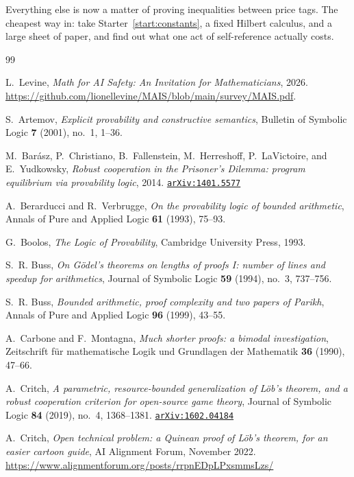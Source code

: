 \documentclass[11pt]{amsart}
\newcommand{\arxiv}[1]{\href{https://arxiv.org/abs/#1}{\texttt{arXiv:#1}}}
\theoremstyle{plain}
\theoremstyle{definition}
\begin{document}
Everything else is now a matter of proving inequalities between price tags. The cheapest way in: take Starter~\ref{start:constants}, a fixed Hilbert calculus, and a large sheet of paper, and find out what one act of self-reference actually costs.

\begin{thebibliography}{99}

L.~Levine,
\emph{Math for AI Safety: An Invitation for Mathematicians},
2026. \url{https://github.com/lionellevine/MAIS/blob/main/survey/MAIS.pdf}.


S.~Artemov,
\emph{Explicit provability and constructive semantics},
Bulletin of Symbolic Logic \textbf{7} (2001), no.~1, 1--36.

M.~Bar\'asz, P.~Christiano, B.~Fallenstein, M.~Herreshoff, P.~LaVictoire, and E.~Yudkowsky,
\emph{Robust cooperation in the Prisoner's Dilemma: program equilibrium via provability logic},
2014. \arxiv{1401.5577}

A.~Berarducci and R.~Verbrugge,
\emph{On the provability logic of bounded arithmetic},
Annals of Pure and Applied Logic \textbf{61} (1993), 75--93.

G.~Boolos,
\emph{The Logic of Provability},
Cambridge University Press, 1993.

S.~R. Buss,
\emph{On G\"odel's theorems on lengths of proofs I: number of lines and speedup for arithmetics},
Journal of Symbolic Logic \textbf{59} (1994), no.~3, 737--756.

S.~R. Buss,
\emph{Bounded arithmetic, proof complexity and two papers of Parikh},
Annals of Pure and Applied Logic \textbf{96} (1999), 43--55.

A.~Carbone and F.~Montagna,
\emph{Much shorter proofs: a bimodal investigation},
Zeitschrift f\"ur mathematische Logik und Grundlagen der Mathematik \textbf{36} (1990), 47--66.

A.~Critch,
\emph{A parametric, resource-bounded generalization of L\"ob's theorem, and a robust cooperation criterion for open-source game theory},
Journal of Symbolic Logic \textbf{84} (2019), no.~4, 1368--1381. \arxiv{1602.04184}

A.~Critch,
\emph{Open technical problem: a Quinean proof of L\"ob's theorem, for an easier cartoon guide},
AI Alignment Forum, November 2022.
\url{https://www.alignmentforum.org/posts/rrpnEDpLPxsmmsLzs/}


\end{thebibliography}
\end{document}

